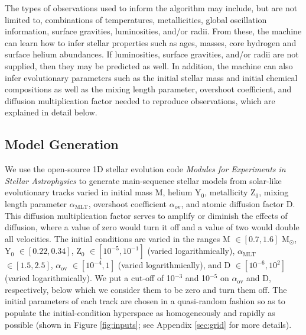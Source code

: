 \documentclass[twocolumn,twocolappendix]{aastex6}
\begin{document}
The types of observations used to inform the algorithm may include, but are not limited to, combinations of temperatures, metallicities, global oscillation information, surface gravities, luminosities, and/or radii. From these, the machine can learn how to infer stellar properties such as ages, masses, core hydrogen and surface helium abundances. If luminosities, surface gravities, and/or radii are not supplied, then they may be predicted as well. In addition, the machine can also infer evolutionary parameters such as the initial stellar mass and initial chemical compositions as well as the mixing length parameter, overshoot coefficient, and diffusion multiplication factor needed to reproduce observations, which are explained in detail below. 

\subsection{Model Generation}
\label{sec:models}
We use the open-source 1D stellar evolution code \emph{Modules for Experiments in Stellar Astrophysics} \citep[MESA;][]{Paxton2011} to generate main-sequence stellar models from solar-like evolutionary tracks varied in initial mass M, helium Y$_0$, metallicity Z$_0$, mixing length parameter $\alpha_{\text{MLT}}$, overshoot coefficient $\alpha_{\text{ov}}$, and atomic diffusion factor D. This diffusion multiplication factor serves to amplify or diminish the effects of diffusion, where a value of zero would turn it off and a value of two would double all velocities. The initial conditions are varied in the ranges M $\in [0.7, 1.6]$ M$_\odot$, Y$_0$ $\in [0.22, 0.34]$, Z$_0$ $\in [10^{-5}, 10^{-1}]$ (varied logarithmically), $\alpha_{\text{MLT}}$ $\in [1.5, 2.5]$, $\alpha_{\text{ov}}$ $\in [10^{-4}, 1]$ (varied logarithmically), and D $\in [10^{-6}, 10^2]$ (varied logarithmically). We put a cut-off of 10$^{-3}$ and 10$^{-5}$ on $\alpha_{\text{ov}}$ and D, respectively, below which we consider them to be zero and turn them off. The initial parameters of each track are chosen in a quasi-random fashion so as to populate the initial-condition hyperspace as homogeneously and rapidly as possible (shown in Figure \ref{fig:inputs}; see Appendix \ref{sec:grid} for more details). %
\end{document}
